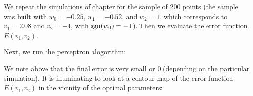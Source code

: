 \documentclass[letterpaper,10pt,english]{jupyterBook}
\begin{document}
\sphinxAtStartPar
We repeat the simulations of chapter {\hyperref[\detokenize{docs/perceptron:perc-lab}]{}} for the sample  of 200 points (the sample was built with \(w_0=-0.25\), \(w_1=-0.52\), and \(w_2=1\), which corresponds to \(v_1=2.08\) and \(v_2=-4\), with \({\rm sgn}(w_0)=-1\)). Then we evaluate the error function \(E(v_1,v_2)\).

\sphinxAtStartPar
Next, we run the perceptron alogorithm:

\sphinxAtStartPar
We note above that the final error is very small or 0 (depending on the particular simulation). It is illuminating to look at a contour map of the error function \(E(v_1, v_2)\) in the vicinity of the optimal parameters:

\begin{sphinxVerbatim}[commandchars=\\\{\}]
   

   
       

    
    
     

\PYG{p}{[}\PYG{p}{[}\PYG{p}{[}\PYG{p}{]}\PYG{p}{[}\PYG{p}{]} 
                \PYG{p}{]}    \PYG{p}{]} 


\end{sphinxVerbatim}
\end{document}
